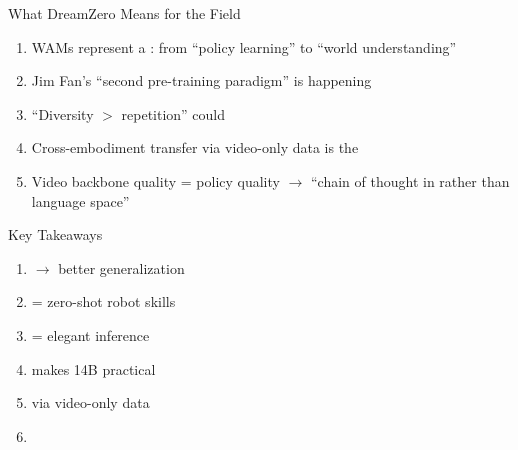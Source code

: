 \begin{frame}{What DreamZero Means for the Field}
\begin{keybox}
\begin{enumerate}
    \item WAMs represent a :
          from ``policy learning'' to ``world understanding''
    \item Jim Fan's ``second pre-training paradigm''
          is happening 
    \item ``Diversity $>$ repetition'' could
    \item Cross-embodiment transfer via video-only data
          is the 
    \item Video backbone quality = policy quality
          $\rightarrow$ ``chain of thought in
           rather than language space''
\end{enumerate}
\end{keybox}
\end{frame}

\begin{frame}{Key Takeaways}
\begin{enumerate}
    \item {}
          $\rightarrow$ better generalization
    \item {}
          = zero-shot robot skills
    \item {}
          = elegant inference
    \item {} makes 14B practical
    \item {}
          via video-only data
    \item {}
\end{enumerate}

\vspace{0.3em}
\begin{center}
\end{center}
\end{frame}

